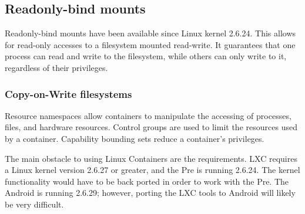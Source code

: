\subsection{Readonly-bind mounts}
Readonly-bind mounts have been available since Linux kernel 2.6.24.  This allows for read-only accesses to a filesystem mounted read-write.  It guarantees that one process can read and write to the filesystem, while others can only write to it, regardless of their privileges.

\subsubsection{Copy-on-Write filesystems}

Resource namespaces allow containers to manipulate the accessing of processes, files, and hardware resources.  Control groups are used to limit the resources used by a container.  Capability bounding sets reduce a container's privileges.  

The main obstacle to using Linux Containers are the requirements.  LXC requires a Linux kernel version 2.6.27 or greater, and the Pre is running 2.6.24.  The kernel functionality would have to be back ported in order to work with the Pre.  The Android is running 2.6.29; however, porting the LXC tools to Android will likely be very difficult.
